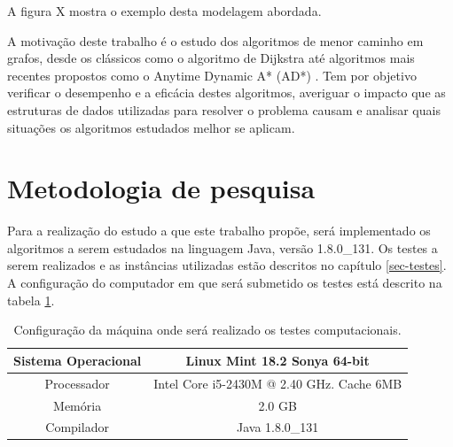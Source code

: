 A figura X mostra o exemplo desta modelagem abordada.

A motivação deste trabalho é o estudo dos algoritmos de menor caminho em grafos, desde os clássicos como o algoritmo de Dijkstra \cite{dijkstra1959note} até algoritmos mais recentes propostos como o Anytime Dynamic A* (AD*) \cite{likhachev2008anytime}. Tem por  objetivo verificar o desempenho e a eficácia destes algoritmos, averiguar o impacto que as estruturas de dados utilizadas para resolver o problema causam e analisar quais situações os algoritmos estudados melhor se aplicam.

\section{Metodologia de pesquisa}
\label{sec-intro-metodologia}
Para a realização do estudo a que este trabalho propõe, será implementado os algoritmos a serem estudados na linguagem Java, versão 1.8.0\_131. Os testes a serem realizados e as instâncias utilizadas estão descritos no capítulo \ref{sec-testes}. A configuração do computador em que será submetido os testes está descrito na tabela \ref{tbl-intro-configuracaomaquina}.

\begin{table}[H]
\centering
\caption{Configuração da máquina onde será realizado os testes computacionais.}
\label{tbl-intro-configuracaomaquina}
\begin{adjustbox}{max width=\textwidth}
\begin{tabular}{|c|c|}
\hline
Sistema Operacional & Linux Mint  18.2  Sonya 64-bit            \\ \hline
Processador         & Intel Core i5-2430M @ 2.40 GHz. Cache 6MB \\ \hline
Memória             & 2.0 GB                                    \\ \hline
Compilador          & Java 1.8.0\_131                           \\ \hline
\end{tabular}
\end{adjustbox}
\end{table}


